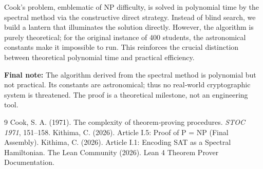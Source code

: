 \documentclass[11pt,a4paper]{article}
\begin{document}
Cook's problem, emblematic of NP difficulty, is solved in polynomial time by the spectral method via the constructive direct strategy. Instead of blind search, we build a lantern that illuminates the solution directly. However, the algorithm is purely theoretical; for the original instance of 400 students, the astronomical constants make it impossible to run. This reinforces the crucial distinction between theoretical polynomial time and practical efficiency.

\vspace{0.5cm}
\noindent\textbf{Final note:} The algorithm derived from the spectral method is polynomial but not practical. Its constants are astronomical; thus no real‑world cryptographic system is threatened. The proof is a theoretical milestone, not an engineering tool.


\begin{thebibliography}{9}
  Cook, S. A. (1971). The complexity of theorem‑proving procedures. \emph{STOC 1971}, 151–158.
  Kithima, C. (2026). Article I.5: Proof of P = NP (Final Assembly).
  Kithima, C. (2026). Article I.1: Encoding SAT as a Spectral Hamiltonian.
  The Lean Community (2026). Lean 4 Theorem Prover Documentation.
\end{thebibliography}
\end{document}
